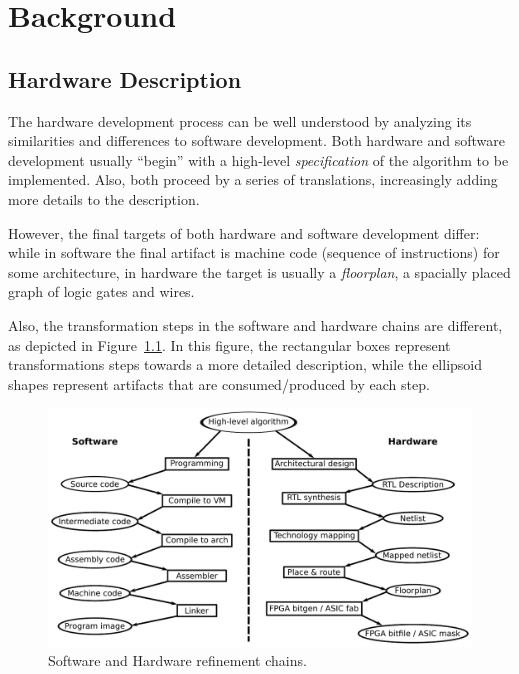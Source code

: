 \chapter{Background}
\label{chap:background}

    \section{Hardware Description}
    \label{sec:hardware-description}
        The hardware development process can be well understood by analyzing its
        similarities and differences to software development.
        Both hardware and software development usually ``begin'' with a high-level \emph{specification}
        of the algorithm to be implemented.
        Also, both proceed by a series of translations, increasingly adding more details to the description.

        However, the final targets of both hardware and software development differ:
        while in software the final artifact is machine code (sequence of instructions) for some architecture,
        in hardware the target is usually a \emph{floorplan}, a spacially placed graph of logic gates and wires.

        Also, the transformation steps in the software and hardware chains are different,
        as depicted in Figure~\ref{fig:sw-hw-chains}.
        In this figure, the rectangular boxes represent transformations steps towards a more detailed description,
        while the ellipsoid shapes represent artifacts that are consumed/produced by each step.

        \begin{figure}[h]
            \centerline{\includegraphics[width=1.0\textwidth]{imgs/sw-hw-chains.pdf}}
            \caption{Software and Hardware refinement chains. \label{fig:sw-hw-chains}}
        \end{figure}

